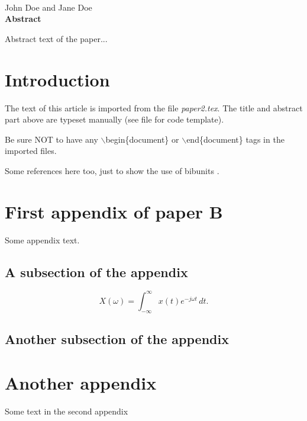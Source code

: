 \begin{bibunit}
\thispagestyle{plain}
\begin{center}
\Large\textbf{\papertitle}\\
\vspace{10mm}
\normalsize John Doe and Jane Doe\\
\vspace{15mm}
\textbf{Abstract}\\
\end{center}
Abstract text of the paper...

\section{Introduction}
The text of this article is imported from the file
\textit{paper2.tex}. The title and abstract part above are typeset
manually (see file for code template).

Be sure NOT to have any $\backslash$begin\{document\} or
$\backslash$end\{document\} tags in the imported files.

Some references here too, just to show the use of bibunits
\nocite{*}.

\paperappendix
\section{First appendix of paper B}
Some appendix text.
\subsection{A subsection of the appendix}
%
\begin{equation}
    X(\omega) = \int_{-\infty}^{\infty} x(t)e^{-j\omega t}\,dt.
\end{equation}
%
\subsection{Another subsection of the appendix}

\section{Another appendix}
Some text in the second appendix

\putbib
\end{bibunit}
